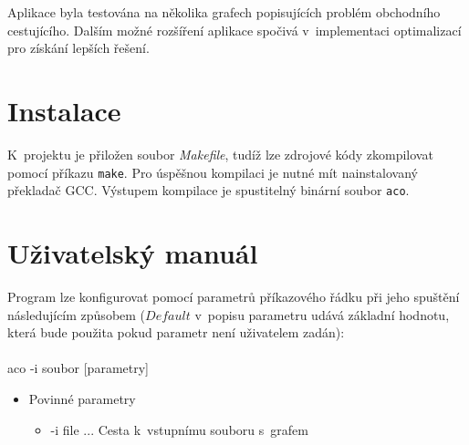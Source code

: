\documentclass[a4paper, 12pt]{article}
\begin{document}
Aplikace byla testována na několika grafech popisujících problém obchodního cestujícího. Dalším možné rozšíření aplikace spočivá v~implementaci optimalizací
pro získání lepších řešení.

\newpage
\appendix
\section{Instalace}
K~projektu je přiložen soubor \emph{Makefile}, tudíž lze zdrojové kódy zkompilovat pomocí příkazu \texttt{make}. Pro úspěšnou kompilaci je nutné mít
nainstalovaný překladač GCC. Výstupem kompilace je spustitelný binární soubor \texttt{aco}.
\label{app:install}
\section{Uživatelský manuál}
Program lze konfigurovat pomocí parametrů příkazového řádku při jeho spuštění následujícím způsobem ($Default$ v~popisu parametru udává základní hodnotu,
která bude použita pokud parametr není uživatelem zadán):
\\
\\
  aco -i soubor [parametry]
  \begin{itemize}
  \item Povinné parametry
    \begin{itemize}
      \item -i file ... Cesta k~vstupnímu souboru s~grafem
    \end{itemize}
  \end{itemize}
\end{document}
